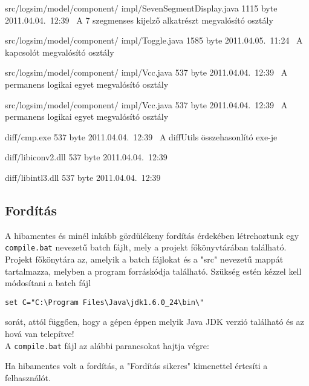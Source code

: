 \begin{fajllista}
\fajl
{src/logsim/model/component/\newline
impl/SevenSegmentDisplay.java} %
{1115 byte} %
{2011.04.04.~12:39~} %
{A 7 szegmenses kijelző alkatrészt megvalósító osztály} %

\fajl
{src/logsim/model/component/\newline
impl/Toggle.java} %
{1585 byte} %
{2011.04.05.~11:24~} %
{A kapcsolót megvalósító osztály} %

\fajl
{src/logsim/model/component/\newline
impl/Vcc.java} %
{537 byte} %
{2011.04.04.~12:39~} %
{A permanens logikai egyet megvalósító osztály} %

\fajl
{src/logsim/model/component/\newline
impl/Vcc.java} %
{537 byte} %
{2011.04.04.~12:39~} %
{A permanens logikai egyet megvalósító osztály} %

\fajl
{diff/cmp.exe} %
{537 byte} %
{2011.04.04.~12:39~} %
{A diffUtils összehasonlító exe-je} %

\fajl
{diff/libiconv2.dll} %
{537 byte} %
{2011.04.04.~12:39~} %
{} %

\fajl
{diff/libintl3.dll} %
{537 byte} %
{2011.04.04.~12:39~} %
{} %

\end{fajllista}

\subsection{Fordítás}
A hibamentes és minél inkább gördülékeny fordítás érdekében létrehoztunk egy \texttt{compile.bat} nevezetű batch fájlt, mely a projekt főkönyvtárában található. Projekt főkönytára az, amelyik a batch fájlokat és a "src" nevezetű mappát tartalmazza, melyben a program forráskódja található. Szükség estén kézzel kell módosítani a batch fájl
\begin{verbatim}
set C="C:\Program Files\Java\jdk1.6.0_24\bin\" 
\end{verbatim}
sorát, attól függően, hogy a gépen éppen melyik Java JDK verzió található és az hová van telepítve!\\

A \texttt{compile.bat} fájl az alábbi parancsokat hajtja végre:

Ha hibamentes volt a fordítás, a "Fordítás sikeres" kimenettel értesíti a felhasználót.\\

